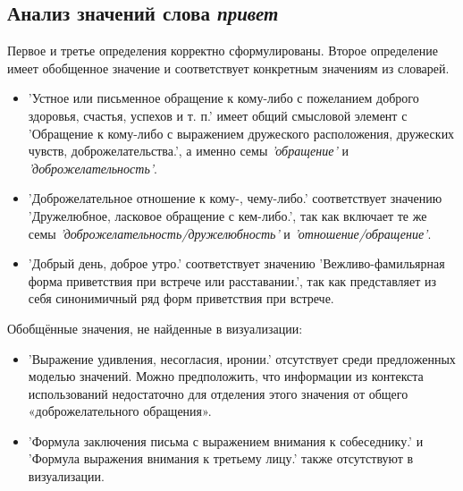 \subsection*{Анализ значений слова \textit{привет}}

Первое и третье определения корректно сформулированы.
Второе определение имеет обобщенное значение и соответствует конкретным значениям из словарей.

\begin{itemize}
    \item ’Устное или письменное обращение к кому-либо с пожеланием доброго здоровья, счастья, успехов и т. п.’
имеет общий смысловой элемент с ’Обращение к кому-либо с выражением дружеского расположения,
дружеских чувств, доброжелательства.’, а именно семы \textit{’обращение’} и \textit{’доброжелательность’}.

    \item ’Доброжелательное отношение к кому-, чему-либо.’ соответствует значению
’Дружелюбное, ласковое обращение с кем-либо.’,
так как включает те же семы \textit{’доброжелательность/дружелюбность’} и \textit{’отношение/обращение’}.

    \item ’Добрый день, доброе утро.’ соответствует значению
’Вежливо-фамильярная форма приветствия при встрече или расставании.’,
так как представляет из себя синонимичный ряд форм приветствия при встрече.
\end{itemize}

Обобщённые значения, не найденные в визуализации:
\begin{itemize}
    \item ’Выражение удивления, несогласия, иронии.’ отсутствует среди предложенных моделью значений.
    Можно предположить, что информации из контекста использований недостаточно для отделения
    этого значения от общего «доброжелательного обращения».

    \item ’Формула заключения письма с выражением внимания к собеседнику.’ и ’Формула выражения внимания к третьему лицу.’ также отсутствуют в визуализации.

%
\end{itemize}

